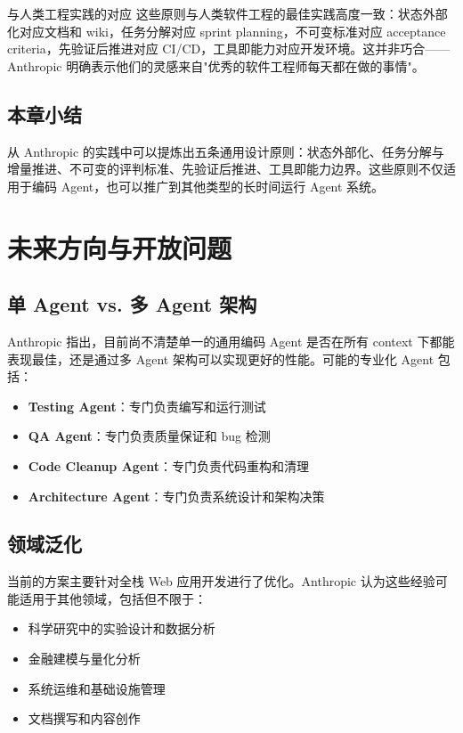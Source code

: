 \documentclass[a4paper]{article}
\begin{document}
\begin{knowledgebox}{与人类工程实践的对应}
这些原则与人类软件工程的最佳实践高度一致：状态外部化对应文档和 wiki，任务分解对应 sprint planning，不可变标准对应 acceptance criteria，先验证后推进对应 CI/CD，工具即能力对应开发环境。这并非巧合——Anthropic 明确表示他们的灵感来自"优秀的软件工程师每天都在做的事情"。
\end{knowledgebox}

\subsection{本章小结}

从 Anthropic 的实践中可以提炼出五条通用设计原则：状态外部化、任务分解与增量推进、不可变的评判标准、先验证后推进、工具即能力边界。这些原则不仅适用于编码 Agent，也可以推广到其他类型的长时间运行 Agent 系统。


\section{未来方向与开放问题}

\subsection{单 Agent vs. 多 Agent 架构}

Anthropic 指出，目前尚不清楚单一的通用编码 Agent 是否在所有 context 下都能表现最佳，还是通过多 Agent 架构可以实现更好的性能。可能的专业化 Agent 包括：

\begin{itemize}
    \item \textbf{Testing Agent}：专门负责编写和运行测试
    \item \textbf{QA Agent}：专门负责质量保证和 bug 检测
    \item \textbf{Code Cleanup Agent}：专门负责代码重构和清理
    \item \textbf{Architecture Agent}：专门负责系统设计和架构决策
\end{itemize}

\subsection{领域泛化}

当前的方案主要针对全栈 Web 应用开发进行了优化。Anthropic 认为这些经验可能适用于其他领域，包括但不限于：

\begin{itemize}
    \item 科学研究中的实验设计和数据分析
    \item 金融建模与量化分析
    \item 系统运维和基础设施管理
    \item 文档撰写和内容创作
\end{itemize}
\end{document}
